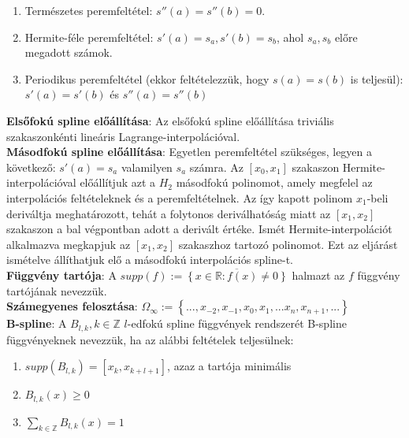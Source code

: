 \documentclass[margin=0px]{article}
\begin{document}
\begin{enumerate}
    \item	Természetes peremfeltétel: $s''(a) = s''(b) = 0$.

    \item	Hermite-féle peremfeltétel: $s'(a) = s_{a}, s'(b) = s_{b}$, ahol $s_{a}, s_{b}$ előre megadott számok.

    \item	Periodikus peremfeltétel (ekkor feltételezzük, hogy $s(a) = s(b)$ is teljesül):
          $s'(a) = s'(b)$ és $s''(a) = s''(b)$
\end{enumerate}

\noindent \textbf{Elsőfokú spline előállítása}: Az elsőfokú spline előállítása triviális szakaszonkénti
lineáris Lagrange-interpolációval.\\

\noindent \textbf{Másodfokú spline előállítása}: Egyetlen peremfeltétel szükséges, legyen a következő: $s'(a) = s_{a}$
valamilyen $s_{a}$ számra. Az $[x_{0},x_{1}]$ szakaszon Hermite-interpolációval előállítjuk azt a $H_{2}$ másodfokú
polinomot, amely megfelel az interpolációs feltételeknek és a peremfeltételnek. Az így kapott polinom $x_{1}$-beli
deriváltja meghatározott, tehát a folytonos deriválhatóság miatt az $[x_{1},x_{2}]$ szakaszon a bal végpontban
adott a derivált értéke. Ismét Hermite-interpolációt alkalmazva megkapjuk az $[x_{1},x_{2}]$ szakaszhoz tartozó
polinomot. Ezt az eljárást ismételve állíthatjuk elő a másodfokú interpolációs spline-t.\\

\noindent \textbf{Függvény tartója}: A $supp(f) := \overline{\left\{x \in \mathbb{R}: f(x) \not = 0 \right\}}$ halmazt
az $f$ függvény tartójának nevezzük.\\

\noindent \textbf{Számegyenes felosztása}: $\Omega_{\infty} := \left\{...,x_{-2},x_{-1},x_{0},x_{1},...x_{n},x_{n+1},...\right\}$\\

\noindent \textbf{B-spline}: A $B_{l,k}, k \in \mathbb{Z}$ $l$-edfokú spline függvények rendszerét B-spline függvényeknek
nevezzük, ha az alábbi feltételek teljesülnek:
\begin{enumerate}
    \item	$supp(B_{l,k}) = [x_{k},x_{k+l+1}]$, azaz a tartója minimális

    \item	$B_{l,k}(x) \geq 0$

    \item	$\displaystyle\sum_{k \in \mathbb{Z}}B_{l,k}(x) = 1$
\end{enumerate}
\end{document}
